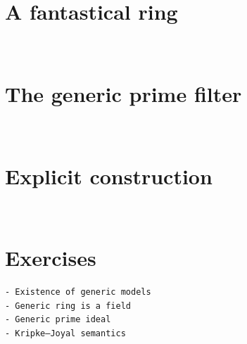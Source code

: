 \documentclass[10pt,reqno,a4paper,openany]{amsbook}
\theoremstyle{definition}
\theoremstyle{plain}
\theoremstyle{remark}
\newcommand{\?}{\,{:}\,}
\renewcommand{\_}{\mathpunct{.}\,}
\begin{document}
\section{A fantastical ring}
\newpage
\ \newpage

\section{The generic prime filter}
\newpage
\ \newpage

\section{Explicit construction}
\newpage
\ \newpage

\section{Exercises}


\vfill{\small%
\begin{verbatim}
- Existence of generic models
- Generic ring is a field
- Generic prime ideal
- Kripke–Joyal semantics
\end{verbatim}
}

\printbibliography
\end{document}
